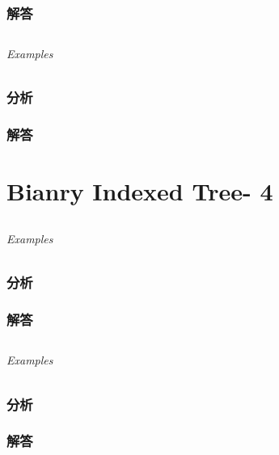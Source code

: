 \documentclass[UTF8,a4paper,12pt]{ctexbook}
\begin{document}
	\subsection{解答}
	
\section{}
	
	\subparagraph{Examples}
	
	\subsection{分析}
	
	\subsection{解答}
	
\chapter{Bianry Indexed Tree- 4}
\section{}
	
	\subparagraph{Examples}
	
	\subsection{分析}
	
	\subsection{解答}
	
\section{}
	
	\subparagraph{Examples}
	
	\subsection{分析}
	
	\subsection{解答}
	
\section{}
	
\end{document}
